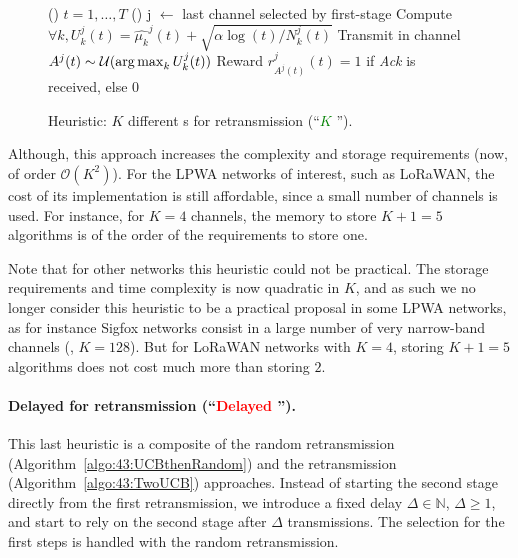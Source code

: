 \begin{figure}[h!]
	\centering
\begin{framed}
	\begin{algorithm}[H]
		\For()
		{$t = 1, \dots, T$}{
			\uElse(){ %
				j $\leftarrow$ last channel selected by first-stage \UCB\;
				Compute $\forall k, U_k^j(t) = \widehat{\mu_k}^j(t) + \sqrt{\alpha \log(t) / N_k^j(t)}$\;
				Transmit in channel $A^j(t) \sim \mathcal{U}(\operatorname*{arg\,max}_k U^j_k(t))$\;
				Reward $r^j_{A^j(t)}(t) = 1$ if \emph{Ack} is received, else $0$\;
			}
		}
		\caption[Heuristic: $K$ different {\UCB}s for retransmission.]{Heuristic: $K$ different {\UCB}s for retransmission (``\textcolor{green}{$K$ \UCB}'').}
		\label{algo:43:UCBthenKp1}
	\end{algorithm}
	\end{framed}
\end{figure}

Although, this approach increases the complexity and storage requirements (now, of order $\mathcal{O}(K^2)$).
For the LPWA networks of interest, such as LoRaWAN, the cost of its implementation is still affordable, since a small number of channels is used.
For instance, for $K=4$ channels,
the memory to store $K+1=5$ algorithms is of the order of the requirements to store one.

Note that for other networks this heuristic could not be practical.
The storage requirements and time complexity is now quadratic in $K$, and as such we no longer consider this heuristic to be a practical proposal in some LPWA networks, as for instance Sigfox networks consist in a large number of very narrow-band channels (\eg, $K=128$).
But for LoRaWAN networks with $K=4$, storing $K+1=5$ algorithms does not cost much more than storing $2$.


\paragraph{Delayed \UCB{} for retransmission (``\textcolor{red}{Delayed \UCB}'').}\label{sub:43:UCBwithDelay}
%
This last heuristic is a composite of
the random retransmission (Algorithm~\ref{algo:43:UCBthenRandom})
and the \UCB{} retransmission (Algorithm~\ref{algo:43:TwoUCB}) approaches.
Instead of starting the second stage \UCB{} directly from the first retransmission, we introduce a fixed delay $\Delta\in\mathbb{N}$, $\Delta \geq 1$,
and start to rely on the second stage \UCB{} after $\Delta$ transmissions.
The selection for the first steps is handled with the random retransmission.

